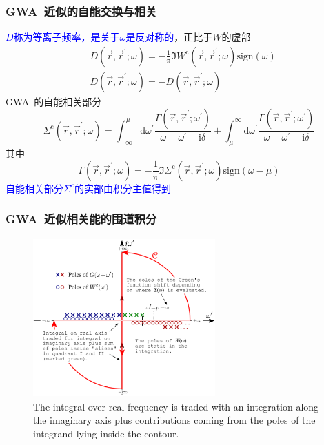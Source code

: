 \documentclass[cjk,slidestop,compress,mathserif,blue]{beamer}
\begin{document}
\frame
{
	\frametitle{\textrm{GWA~}近似的自能交换与相关}
	\textcolor{blue}{$D$称为等离子频率，是关于$\omega$是反对称的}，正比于$W$的虚部
	\begin{displaymath}
		\begin{aligned}
			&D(\vec r,\vec r^{\prime};\omega)=-\frac1{\pi}\Im W^{\mathrm{c}}(\vec r,\vec r^{\prime};\omega)\textrm{sign}(\omega)\\
			&D(\vec r,\vec r^{\prime};\omega)=-D(\vec r,\vec r^{\prime};\omega)
		\end{aligned}
	\end{displaymath}
	\textrm{GWA~}的自能相关部分
	\begin{displaymath}
		\Sigma^{\mathrm{c}}(\vec r,\vec r^{\prime};\omega)=\int_{-\infty}^{\mu}\mathrm{d}\omega^{\prime}\frac{\Gamma(\vec r,\vec r^{\prime};\omega^{\prime})}{\omega-\omega^{\prime}-\mathrm{i}\delta}+\int_{\mu}^{\infty}\mathrm{d}\omega^{\prime}\frac{\Gamma(\vec r,\vec r^{\prime};\omega^{\prime})}{\omega-\omega^{\prime}+\mathrm{i}\delta}
	\end{displaymath}
	其中
	\begin{displaymath}
		\Gamma(\vec r,\vec r^{\prime};\omega)=-\frac1{\pi}\Im\Sigma^{\mathrm{c}}(\vec r,\vec r^{\prime};\omega)\textrm{sign}(\omega-\mu)
	\end{displaymath}
	\textcolor{blue}{自能相关部分$\Sigma^{\mathrm{c}}$的实部由积分主值得到}
}

\frame
{
	\frametitle{\textrm{GWA~}近似相关能的围道积分}
\begin{figure}[h!]
\centering
\vspace*{-0.2in}
\includegraphics[height=2.4in,width=2.75in,viewport=0 0 950 800,clip]{Figures/GWA_Contour_deformation.png}
\caption{\small \textrm{The integral over real frequency is traded with an integration along the imaginary axis plus contributions coming from the poles of the integrand lying inside the contour.}}%
\label{GWA_Contour_deformation}
\end{figure} 
}
\end{document}
